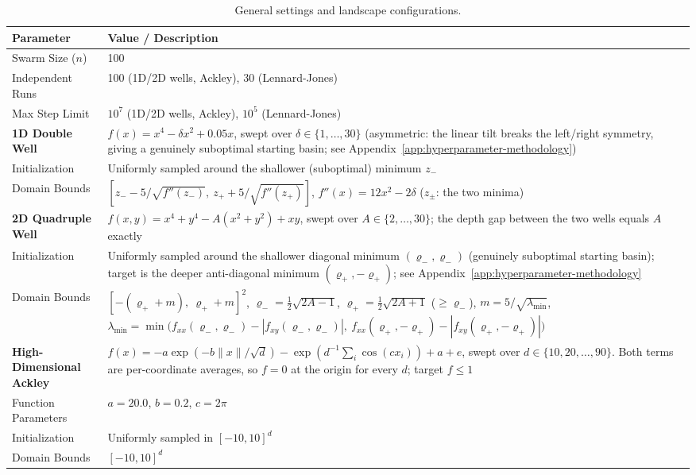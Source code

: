 \documentclass{opt2026} %
\begin{document}
\begin{table}[!htbp]
\centering
\caption{General settings and landscape configurations.}
\label{tab:general_settings}
\begin{tabular}{@{}lp{}@{}}
\toprule
\textbf{Parameter} & \textbf{Value / Description} \\
\midrule
Swarm Size ($n$) & 100 \\
Independent Runs & 100 (1D/2D wells, Ackley), 30 (Lennard-Jones) \\
Max Step Limit & $10^7$ (1D/2D wells, Ackley), $10^5$ (Lennard-Jones) \\
\midrule
\textbf{1D Double Well} & $f(x) = x^4 - \delta x^2 + 0.05x$, swept over $\delta\in\{1,\dots,30\}$ (asymmetric: the linear tilt breaks the left/right symmetry, giving a genuinely suboptimal starting basin; see Appendix~\ref{app:hyperparameter-methodology}) \\
Initialization & Uniformly sampled around the shallower (suboptimal) minimum $z_-$ \\
Domain Bounds & $[z_- - 5/\sqrt{f''(z_-)},\ z_+ + 5/\sqrt{f''(z_+)}]$, $f''(x)=12x^2-2\delta$ ($z_\pm$: the two minima) \\
\midrule
\textbf{2D Quadruple Well} & $f(x,y) = x^4 + y^4 - A(x^2 + y^2) + xy$, swept over $A\in\{2,\dots,30\}$; the depth gap between the two wells equals $A$ exactly \\
Initialization & Uniformly sampled around the shallower diagonal minimum $(\varrho_-,\varrho_-)$ (genuinely suboptimal starting basin); target is the deeper anti-diagonal minimum $(\varrho_+,-\varrho_+)$; see Appendix~\ref{app:hyperparameter-methodology} \\
Domain Bounds & $[-(\varrho_++m),\ \varrho_++m]^2$, $\varrho_-=\tfrac12\sqrt{2A-1}$, $\varrho_+=\tfrac12\sqrt{2A+1}$ ($\geq\varrho_-$), $m=5/\sqrt{\lambda_{\min}}$, $\lambda_{\min}=\min\big(f_{xx}(\varrho_-,\varrho_-)-|f_{xy}(\varrho_-,\varrho_-)|,\ f_{xx}(\varrho_+,-\varrho_+)-|f_{xy}(\varrho_+,-\varrho_+)|\big)$ \\
\midrule
\textbf{High-Dimensional Ackley} & $f(x)=-a\exp(-b\lVert x\rVert/\sqrt{d})-\exp(d^{-1}\sum_i\cos(cx_i))+a+e$, swept over $d\in\{10,20,\dots,90\}$. Both terms are per-coordinate averages, so $f=0$ at the origin for every $d$; target $f\le1$ \\
Function Parameters & $a=20.0$, $b=0.2$, $c=2\pi$ \\
Initialization & Uniformly sampled in $[-10, 10]^d$ \\
Domain Bounds & $[-10, 10]^d$ \\

\end{tabular}
\end{table}
\end{document}
